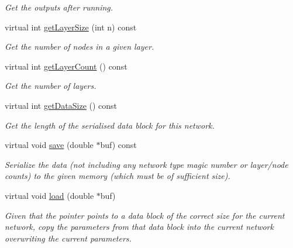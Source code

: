 \begin{DoxyCompactItemize}
\begin{DoxyCompactList}\small\item\em Get the outputs after running. \end{DoxyCompactList}\item 
virtual int \hyperlink{classBPNet_afbf10480c672d8a6e3cbf4071f447cc8}{get\+Layer\+Size} (int n) const 
\begin{DoxyCompactList}\small\item\em Get the number of nodes in a given layer. \end{DoxyCompactList}\item 
virtual int \hyperlink{classBPNet_af52311c47d488b0121ea59574e2b9c05}{get\+Layer\+Count} () const 
\begin{DoxyCompactList}\small\item\em Get the number of layers. \end{DoxyCompactList}\item 
virtual int \hyperlink{classBPNet_ab0071a9b17ba5d42959ce600d29a255c}{get\+Data\+Size} () const 
\begin{DoxyCompactList}\small\item\em Get the length of the serialised data block for this network. \end{DoxyCompactList}\item 
virtual void \hyperlink{classBPNet_a7ef14370548350daecedcb275ba88c07}{save} (double $\ast$buf) const 
\begin{DoxyCompactList}\small\item\em Serialize the data (not including any network type magic number or layer/node counts) to the given memory (which must be of sufficient size). \end{DoxyCompactList}\item 
virtual void \hyperlink{classBPNet_a11724f2263de9dcbc0f9172b464732c7}{load} (double $\ast$buf)
\begin{DoxyCompactList}\small\item\em Given that the pointer points to a data block of the correct size for the current network, copy the parameters from that data block into the current network overwriting the current parameters. \end{DoxyCompactList}\end{DoxyCompactItemize}
